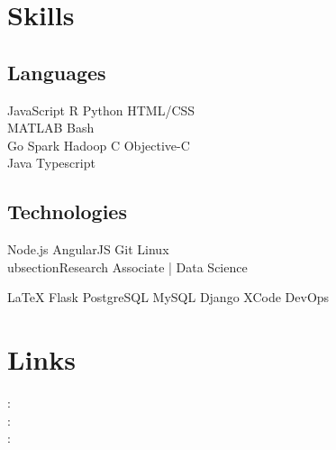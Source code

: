 \documentclass[]{deedy-resume-openfont}
\begin{document}
\begin{minipage}[t]{0.33\textwidth}
\section{Skills}
\subsection{Languages}
JavaScript \textbullet{} R \textbullet{} Python \textbullet{} HTML/CSS \\
MATLAB \textbullet{} Bash\\
Go \textbullet{} Spark \textbullet{} Hadoop \textbullet{} C \textbullet{} Objective-C \\
Java \textbullet{} Typescript\\
\sectionsep

\subsection{Technologies}
Node.js \textbullet{} AngularJS \textbullet{} Git \textbullet{} Linux \\
ubsection{Research Associate | Data Science}

%
%
%
%
%
%
LaTeX \textbullet{} Flask \textbullet{} PostgreSQL \textbullet{} MySQL
Django \textbullet{}  XCode \textbullet{} DevOps
\sectionsep


\section{Links}
: \href{https://github.com/prajnak}{} \\
: \href{https://www.linkedin.com/in/prajnak}{} \\
:  \href{https://prajis.me}{} \\
\sectionsep


\end{minipage}
\end{document}
